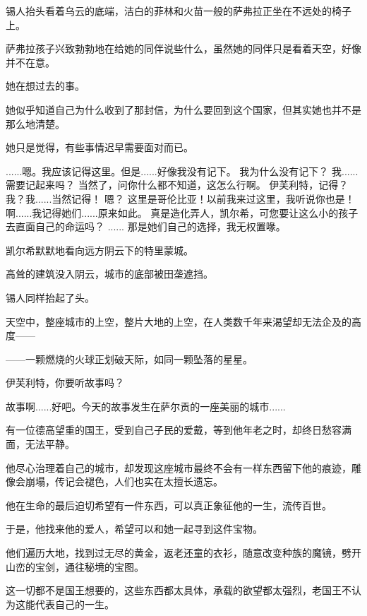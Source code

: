 \documentclass[openany]{book}
\begin{document}
\par
锡人抬头看着乌云的底端，洁白的菲林和火苗一般的萨弗拉正坐在不远处的椅子上。\par
萨弗拉孩子兴致勃勃地在给她的同伴说些什么，虽然她的同伴只是看着天空，好像并不在意。\par
她在想过去的事。\par
她似乎知道自己为什么收到了那封信，为什么要回到这个国家，但其实她也并不是那么地清楚。\par
她只是觉得，有些事情迟早需要面对而已。
\begin{dialogue}
     ......嗯。我应该记得这里。但是......好像我没有记下。
     我为什么没有记下？
     我......需要记起来吗？
     当然了，问你什么都不知道，这怎么行啊。
     伊芙利特，记得？
     我？我......当然记得！
     嗯？
     这里是哥伦比亚！以前我来过这里，我听说你也是！
     啊......我记得她们......原来如此。
     真是造化弄人，凯尔希，可您要让这么小的孩子去直面自己的命运吗？
     ......
     那是她们自己的选择，我无权置喙。
\end{dialogue}
\par
凯尔希默默地看向远方阴云下的特里蒙城。\par
高耸的建筑没入阴云，城市的底部被田垄遮挡。\par
锡人同样抬起了头。\par
天空中，整座城市的上空，整片大地的上空，在人类数千年来渴望却无法企及的高度——\par
——一颗燃烧的火球正划破天际，如同一颗坠落的星星。\\
\par
伊芙利特，你要听故事吗？\par
故事啊......好吧。今天的故事发生在萨尔贡的一座美丽的城市......\par
有一位德高望重的国王，受到自己子民的爱戴，等到他年老之时，却终日愁容满面，无法平静。\par
他尽心治理着自己的城市，却发现这座城市最终不会有一样东西留下他的痕迹，雕像会崩塌，传记会褪色，人们也实在太擅长遗忘。\par
他在生命的最后迫切希望有一件东西，可以真正象征他的一生，流传百世。\par
于是，他找来他的爱人，希望可以和她一起寻到这件宝物。\par
他们遍历大地，找到过无尽的黄金，返老还童的衣衫，随意改变种族的魔镜，劈开山峦的宝剑，通往秘境的宝图。\par
这一切都不是国王想要的，这些东西都太具体，承载的欲望都太强烈，老国王不认为这能代表自己的一生。\par
\end{document}
